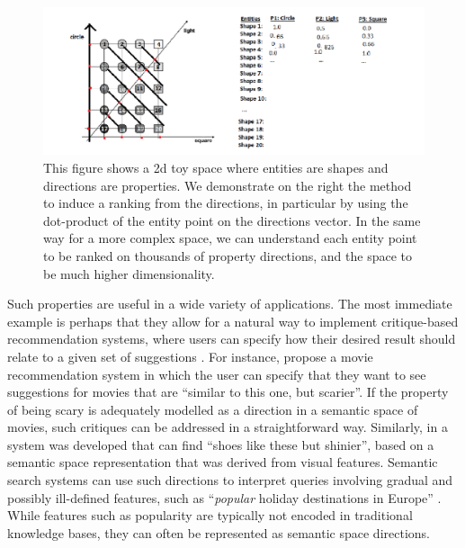 \begin{figure}[t]
	\includegraphics[width=\textwidth]{images/toydirections.png}
	\centering
	\caption{This figure shows a 2d toy space where entities are shapes and directions are properties. We demonstrate on the right the method to induce a ranking from the directions, in particular by using the dot-product of the entity point on the directions vector. In the same way for a more complex space, we can understand each entity point to be ranked on thousands of property directions, and the space to be much higher dimensionality.}\label{ToyDirection}
\end{figure}

 Such properties are useful in a wide variety of applications. The most immediate example is perhaps that they allow for a natural way to implement critique-based recommendation systems, where users can specify how their desired result should relate to a given set of suggestions \cite{viappiani2006preference}. For instance, \cite{Vig:2012:TGE:2362394.2362395} propose a movie recommendation system in which the user can specify that they want to see suggestions for movies that are ``similar to this one, but scarier''. If the property of being scary is adequately modelled as a direction in a semantic space of movies, such critiques can be addressed in a straightforward way. Similarly, in \cite{kovashka2012whittlesearch} a system was developed that can find ``shoes like these but shinier'', based on a semantic space representation that was derived from visual features. Semantic search systems can use such directions to interpret queries involving gradual and possibly ill-defined features, such as ``\emph{popular} holiday destinations in Europe'' \cite{DBLP:conf/sigir/JameelBS17}. While features such as popularity are typically not encoded in traditional knowledge bases, they can often be represented as semantic space directions.  %


